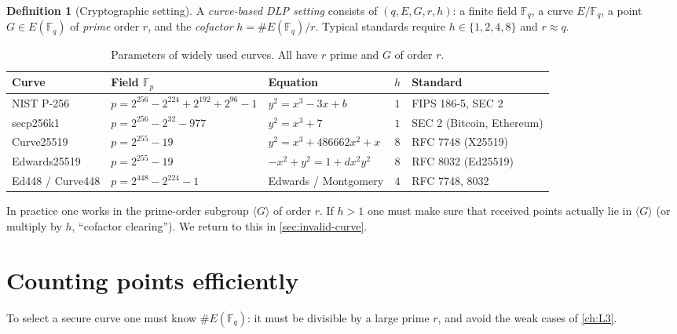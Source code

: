 \documentclass[11pt,a4paper,oneside]{book}
\theoremstyle{plain}
\theoremstyle{definition}
\newtheorem{definition}[theorem]{Definition}
\theoremstyle{remark}
\newcommand{\Fp}{\mathbb{F}_p}
\newcommand{\Fq}{\mathbb{F}_q}
\begin{document}
\begin{definition}[Cryptographic setting]\label{def:cryptosetting}
A \emph{curve-based DLP setting} consists of $(q,E,G,r,h)$: a finite field $\Fq$, a curve $E/\Fq$, a point $G\in E(\Fq)$ of \emph{prime} order $r$, and the \emph{cofactor} $h=\#E(\Fq)/r$. Typical standards require $h\in\{1,2,4,8\}$ and $r\approx q$.
\end{definition}

\begin{table}[ht]
\centering\footnotesize\setlength{\tabcolsep}{3pt}
\caption{Parameters of widely used curves. All have $r$ prime and $G$ of order $r$.}
\label{tab:curves}
\begin{tabular}{@{}lllcl@{}}
\toprule
Curve & Field $\Fp$ & Equation & $h$ & Standard\\
\midrule
NIST P-256 & $p=2^{256}-2^{224}+2^{192}+2^{96}-1$ & $y^2=x^3-3x+b$ & $1$ & FIPS 186-5, SEC 2\\
secp256k1 & $p=2^{256}-2^{32}-977$ & $y^2=x^3+7$ & $1$ & SEC 2 (Bitcoin, Ethereum)\\
Curve25519 & $p=2^{255}-19$ & $y^2=x^3+486662x^2+x$ & $8$ & RFC 7748 (X25519)\\
Edwards25519 & $p=2^{255}-19$ & $-x^2+y^2=1+dx^2y^2$ & $8$ & RFC 8032 (Ed25519)\\
Ed448 / Curve448 & $p=2^{448}-2^{224}-1$ & Edwards / Montgomery & $4$ & RFC 7748, 8032\\
\bottomrule
\end{tabular}
\end{table}

\begin{keyidea}
In practice one works in the prime-order subgroup $\langle G\rangle$ of order $r$. If $h>1$ one must make sure that received points actually lie in $\langle G\rangle$ (or multiply by $h$, ``cofactor clearing''). We return to this in \cref{sec:invalid-curve}.
\end{keyidea}

\section{Counting points efficiently}

To select a secure curve one must know $\#E(\Fq)$: it must be divisible by a large prime $r$, and avoid the weak cases of \cref{ch:L3}.
\end{document}
